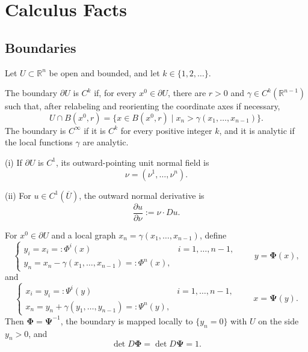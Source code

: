 
\section{Calculus Facts}
\label{sec:calculus-facts}

\subsection{Boundaries}

Let $U\subset\mathbb R^n$ be open and bounded, and let $k\in\{1,2,\ldots\}$.

\begin{definition}[$C^k$ boundary]
\label{def:ck-boundary-regularity}
The boundary $\partial U$ is $C^k$ if, for every $x^0\in\partial U$, there are $r>0$ and $\gamma\in C^k(\mathbb R^{n-1})$ such that, after relabeling and reorienting the coordinate axes if necessary,
\[
U\cap B(x^0,r)
=\{x\in B(x^0,r)\mid
x_n>\gamma(x_1,\ldots,x_{n-1})\}.
\]
The boundary is $C^\infty$ if it is $C^k$ for every positive integer $k$, and it is analytic if the local functions $\gamma$ are analytic.
\end{definition}

\begin{definition}
\label{def:outward-normal-and-normal-derivative}
(i) If $\partial U$ is $C^1$, its outward-pointing unit normal field is
\[
\nu=(\nu^1,\ldots,\nu^n).
\]

(ii) For $u\in C^1(\overline U)$, the outward normal derivative is
\[
\frac{\partial u}{\partial\nu}:=\nu\cdot Du.
\]
\end{definition}

For $x^0\in\partial U$ and a local graph $x_n=\gamma(x_1,\ldots,x_{n-1})$, define
\[
\begin{cases}
y_i=x_i=:\Phi^i(x) & i=1,\ldots,n-1,\\
y_n=x_n-\gamma(x_1,\ldots,x_{n-1})=:\Phi^n(x),
\end{cases}
\qquad y=\mathbf\Phi(x),
\]
and
\[
\begin{cases}
x_i=y_i=:\Psi^i(y) & i=1,\ldots,n-1,\\
x_n=y_n+\gamma(y_1,\ldots,y_{n-1})=:\Psi^n(y),
\end{cases}
\qquad x=\mathbf\Psi(y).
\]
Then $\mathbf\Phi=\mathbf\Psi^{-1}$, the boundary is mapped locally to $\{y_n=0\}$ with $U$ on the side $y_n>0$, and
\[
\det D\mathbf\Phi=\det D\mathbf\Psi=1.
\]

